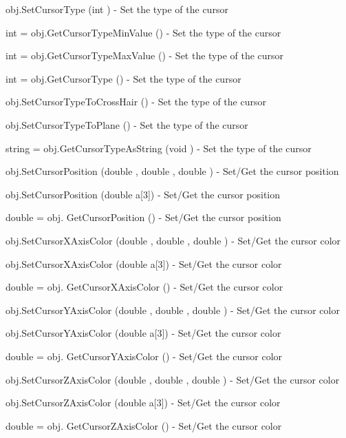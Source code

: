 \begin{DoxyItemize}
\item {\ttfamily obj.\-Set\-Cursor\-Type (int )} -\/ Set the type of the cursor  
\item {\ttfamily int = obj.\-Get\-Cursor\-Type\-Min\-Value ()} -\/ Set the type of the cursor  
\item {\ttfamily int = obj.\-Get\-Cursor\-Type\-Max\-Value ()} -\/ Set the type of the cursor  
\item {\ttfamily int = obj.\-Get\-Cursor\-Type ()} -\/ Set the type of the cursor  
\item {\ttfamily obj.\-Set\-Cursor\-Type\-To\-Cross\-Hair ()} -\/ Set the type of the cursor  
\item {\ttfamily obj.\-Set\-Cursor\-Type\-To\-Plane ()} -\/ Set the type of the cursor  
\item {\ttfamily string = obj.\-Get\-Cursor\-Type\-As\-String (void )} -\/ Set the type of the cursor  
\item {\ttfamily obj.\-Set\-Cursor\-Position (double , double , double )} -\/ Set/\-Get the cursor position  
\item {\ttfamily obj.\-Set\-Cursor\-Position (double a\mbox{[}3\mbox{]})} -\/ Set/\-Get the cursor position  
\item {\ttfamily double = obj. Get\-Cursor\-Position ()} -\/ Set/\-Get the cursor position  
\item {\ttfamily obj.\-Set\-Cursor\-X\-Axis\-Color (double , double , double )} -\/ Set/\-Get the cursor color  
\item {\ttfamily obj.\-Set\-Cursor\-X\-Axis\-Color (double a\mbox{[}3\mbox{]})} -\/ Set/\-Get the cursor color  
\item {\ttfamily double = obj. Get\-Cursor\-X\-Axis\-Color ()} -\/ Set/\-Get the cursor color  
\item {\ttfamily obj.\-Set\-Cursor\-Y\-Axis\-Color (double , double , double )} -\/ Set/\-Get the cursor color  
\item {\ttfamily obj.\-Set\-Cursor\-Y\-Axis\-Color (double a\mbox{[}3\mbox{]})} -\/ Set/\-Get the cursor color  
\item {\ttfamily double = obj. Get\-Cursor\-Y\-Axis\-Color ()} -\/ Set/\-Get the cursor color  
\item {\ttfamily obj.\-Set\-Cursor\-Z\-Axis\-Color (double , double , double )} -\/ Set/\-Get the cursor color  
\item {\ttfamily obj.\-Set\-Cursor\-Z\-Axis\-Color (double a\mbox{[}3\mbox{]})} -\/ Set/\-Get the cursor color  
\item {\ttfamily double = obj. Get\-Cursor\-Z\-Axis\-Color ()} -\/ Set/\-Get the cursor color  

\end{DoxyItemize}
